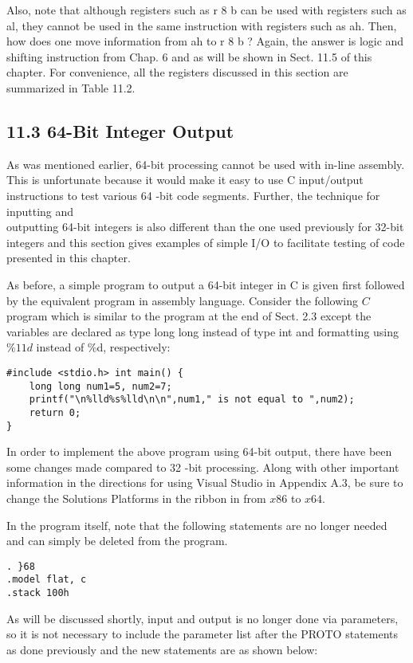 \documentclass[10pt]{article}
\begin{document}
Also, note that although registers such as r 8 b can be used with registers such as al, they cannot be used in the same instruction with registers such as ah. Then, how does one move information from ah to r 8 b ? Again, the answer is logic and shifting instruction from Chap. 6 and as will be shown in Sect. 11.5 of this chapter. For convenience, all the registers discussed in this section are summarized in Table 11.2.

\subsection*{11.3 64-Bit Integer Output}
As was mentioned earlier, 64-bit processing cannot be used with in-line assembly. This is unfortunate because it would make it easy to use C input/output instructions to test various 64 -bit code segments. Further, the technique for inputting and\\
outputting 64-bit integers is also different than the one used previously for 32-bit integers and this section gives examples of simple I/O to facilitate testing of code presented in this chapter.

As before, a simple program to output a 64-bit integer in C is given first followed by the equivalent program in assembly language. Consider the following $C$ program which is similar to the program at the end of Sect. 2.3 except the variables are declared as type long long instead of type int and formatting using $\% 11 d$ instead of \%d, respectively:

\begin{verbatim}
#include <stdio.h> int main() {
    long long num1=5, num2=7;
    printf("\n%lld%s%lld\n\n",num1," is not equal to ",num2);
    return 0;
}
\end{verbatim}

In order to implement the above program using 64-bit output, there have been some changes made compared to 32 -bit processing. Along with other important information in the directions for using Visual Studio in Appendix A.3, be sure to change the Solutions Platforms in the ribbon in from $x 86$ to $x 64$.

In the program itself, note that the following statements are no longer needed and can simply be deleted from the program.

\begin{verbatim}
. }68
.model flat, c
.stack 100h
\end{verbatim}

As will be discussed shortly, input and output is no longer done via parameters, so it is not necessary to include the parameter list after the PROTO statements as done previously and the new statements are as shown below:
\end{document}

